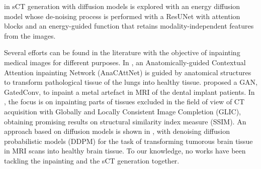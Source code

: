in \cite{Fu2024} sCT generation with diffusion models is explored with an energy diffusion model whose de-noising process is performed with a ResUNet with attention blocks and an energy-guided function that retains modality-independent features from the images.

Several efforts can be found in the literature with the objective of inpainting medical images for different purposes. 
In \cite{Pedrosa2025}, an Anatomically-guided Contextual Attention inpainting Network (AnaCAttNet) is guided by anatomical structures to transform pathological tissue of the lungs into healthy tissue.
\cite{Xie2022} proposed a GAN, GatedConv, to inpaint a metal artefact in MRI of the dental implant patients. 
In \cite{Kim2024}, the focus is on inpainting parts of tissues excluded in the field of view of CT acquisition with Globally and Locally Consistent Image Completion (GLIC)\cite{glcic}, obtaining promising results on structural similarity index measure (SSIM). 
An approach based on diffusion models is shown in \cite{durrer2024denoisingdiffusionmodelsinpainting}, with denoising diffusion probabilistic models (DDPM) for the task of transforming tumorous brain tissue in MRI scans into healthy brain tissue. 
To our knowledge, no works have been tackling the inpainting and the sCT generation together. 
